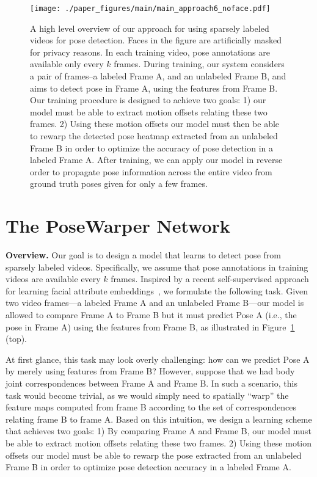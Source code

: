 \documentclass{article}
\begin{document}
\begin{figure}
\begin{center}
   \texttt{[image: ./paper\_figures/main/main\_approach6\_noface.pdf]}
\end{center}
\vspace{-0.1cm}
   \caption{A high level overview of our approach for using sparsely labeled videos for pose detection. Faces in the figure are artificially masked for privacy reasons. In each training video, pose annotations are available only every $k$ frames. During training, our system considers a pair of frames--a labeled Frame A, and an unlabeled Frame B, and aims to detect pose in Frame A, using the features from Frame B.  Our training procedure is designed to achieve two goals: 1) our model must be able to extract motion offsets relating these two frames. 2) Using these motion offsets our model must then be able to rewarp the detected pose heatmap extracted from an unlabeled Frame B in order to optimize the accuracy of pose detection in a labeled Frame A. After training, we can apply our model in reverse order to propagate pose information across the entire video from ground truth poses given for only a few frames.\vspace{-0.5cm}} \label{main_fig}
\end{figure}


\section{The PoseWarper Network}


\textbf{Overview.} Our goal is to design a model that learns to detect pose from sparsely labeled videos. Specifically, we assume that pose annotations in training videos are available every $k$ frames. Inspired by a recent self-supervised approach for learning facial attribute embeddings~\cite{Wiles18a}, we formulate the following task. Given two video frames---a labeled Frame A and an unlabeled Frame B---our model is allowed to compare Frame A to Frame B but it must predict Pose A (i.e., the pose in Frame A) using the features from Frame B, as illustrated in Figure~\ref{main_fig} (top).

At first glance, this task may look overly challenging: how can we predict Pose A by merely using features from Frame B? However, suppose that we had body joint correspondences between Frame A and Frame B. In such a scenario, this task would become trivial, as we would simply need to spatially ``warp'' the feature maps computed from frame B according to the set of correspondences relating frame B to frame A. Based on this intuition, we design a learning scheme that achieves two goals: 1) By comparing Frame A and Frame B, our model must be able to extract motion offsets relating these two frames. 2) Using these motion offsets our model  must be able to rewarp the pose extracted from an unlabeled Frame B in order to optimize pose detection accuracy in a labeled Frame A. 
\end{document}
